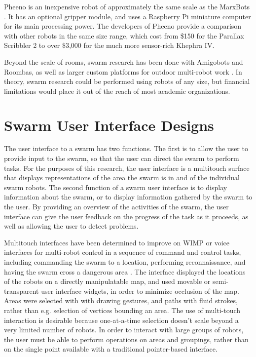 Pheeno is an inexpensive robot of approximately the same scale as the MarxBots \citep{wilson2016pheeno}.
It has an optional gripper module, and uses a Raspberry Pi miniature computer for its main processing power. 
The developers of Pheeno provide a comparison with other robots in the same size range, which cost from \$150 for the Parallax Scribbler 2 to over \$3,000 for the much more sensor-rich Khephra IV. 

Beyond the scale of rooms, swarm research has been done with Amigobots and Roombas, as well as larger custom platforms for outdoor multi-robot work \citep{guo2007bio, tammet2008rfid, olson2013cacm}.
In theory, swarm research could be performed using robots of any size, but financial limitations would place it out of the reach of most academic organizations. 


\section{Swarm User Interface Designs} \label{section:Swarm_User_Interface_Designs}

The user interface to a swarm has two functions. 
The first is to allow the user to provide input to the swarm, so that the user can direct the swarm to perform tasks. 
For the purposes of this research, the user interface is a multitouch surface that displays representations of the area the swarm is in and of the individual swarm robots. 
The second function of a swarm user interface is to display information about the swarm, or to display information gathered by the swarm to the user. 
By providing an overview of the activities of the swarm, the user interface can give the user feedback on the progress of the task as it proceeds, as well as allowing the user to detect problems. 

Multitouch interfaces have been determined to improve on WIMP or voice interfaces for multi-robot control in a sequence of command and control tasks, including commanding the swarm to a location, performing reconnaissance, and having the swarm cross a dangerous area \citep{hayes2010multi}.
The interface displayed the locations of the robots on a directly manipulatable map, and used movable or semi-transparent user interface widgets, in order to minimize occlusion of the map. 
Areas were selected with with drawing gestures, and paths with fluid strokes, rather than e.g. selection of vertices bounding an area.
The use of multi-touch interaction is desirable because one-at-a-time selection doesn't scale beyond a very limited number of robots.
In order to interact with large groups of robots, the user must be able to perform operations on areas and groupings, rather than on the single point available with a traditional pointer-based interface. 

